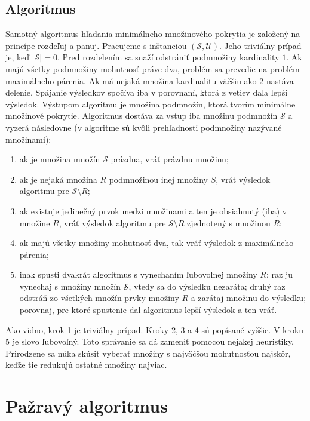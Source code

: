 \subsection{Algoritmus}

Samotný algoritmus hľadania minimálneho množinového pokrytia je založený na 
princípe rozdeľuj a panuj. Pracujeme s inštanciou $(\mathcal{S}, \mathcal{U})$. 
Jeho triviálny prípad je, keď $|\mathcal{S}| = 0$. Pred rozdelením sa snaží 
odstrániť podmnožiny kardinality $1$.  Ak majú všetky podmnožiny mohutnosť 
práve dva, problém sa prevedie na problém maximálneho párenia. Ak má nejaká 
množina kardinalitu väčšiu ako 2 nastáva delenie. Spájanie výsledkov spočíva 
iba v porovnaní, ktorá z vetiev dala lepší výsledok. Výstupom algoritmu je 
množina podmnožín, ktorá tvorím minimálne množinové pokrytie. Algoritmus 
dostáva za vstup iba množinu podmnožín $\mathcal{S}$ a vyzerá následovne 
(v algoritme sú kvôli prehľadnosti podmnožiny nazývané množinami):

\begin{enumerate}
	\item ak je množina množín $\mathcal{S}$ prázdna, vráť prázdnu množinu;
	\item ak je nejaká množina $R$ podmnožinou inej množiny $S$, vráť výsledok 
		algoritmu pre $\mathcal{S} \setminus R$;
	\item ak existuje jedinečný prvok medzi množinami a ten je obsiahnutý (iba) 
		v množine $R$, vráť výsledok algoritmu pre $\mathcal{S} \setminus R$ 
		zjednotený s množinou $R$;
	\item ak majú všetky množiny mohutnosť dva, tak vráť výsledok z maximálneho 
		párenia;
	\item inak spusti dvakrát algoritmus s vynechaním ľubovoľnej množiny $R$; 
		raz ju vynechaj s množiny množín $\mathcal{S}$, vtedy sa do výsledku 
		nezaráta; druhý raz odstráň zo všetkých množín prvky množiny $R$ a 
		zarátaj množinu do výsledku; porovnaj, pre ktoré spustenie dal 
		algoritmus lepší výsledok a ten vráť.
\end{enumerate}

Ako vidno, krok 1 je triviálny prípad. Kroky 2, 3 a 4 sú popísané vyššie. 
V kroku 5 je slovo ľubovoľný. Toto správanie sa dá zameniť pomocou nejakej 
heuristiky. Prirodzene sa núka skúsiť vyberať množiny s najväčšou mohutnosťou 
najskôr, keďže tie redukujú ostatné množiny najviac.

\section{Pažravý algoritmus}

